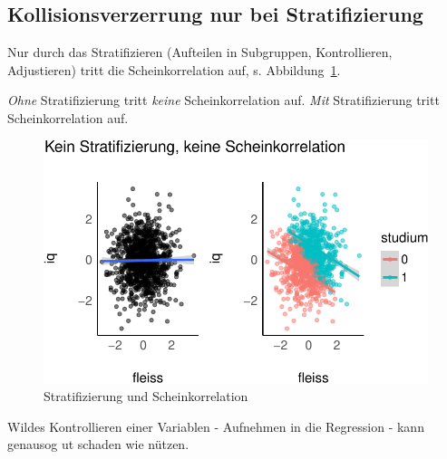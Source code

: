 \documentclass[
  a4paper,
  DIV=11]{scrreprt}
\theoremstyle{definition}
\theoremstyle{remark}
\begin{document}
\hypertarget{kollisionsverzerrung-nur-bei-stratifizierung}{%
\subsection{Kollisionsverzerrung nur bei
Stratifizierung}\label{kollisionsverzerrung-nur-bei-stratifizierung}}

Nur durch das Stratifizieren (Aufteilen in Subgruppen, Kontrollieren,
Adjustieren) tritt die Scheinkorrelation auf, s.
Abbildung~\ref{fig-eignung-strat}.

\begin{tcolorbox}[enhanced jigsaw, leftrule=.75mm, toptitle=1mm, bottomtitle=1mm, titlerule=0mm, breakable, colframe=quarto-callout-note-color-frame, title=\textcolor{quarto-callout-note-color}{\faInfo}\hspace{0.5em}{Hinweis}, rightrule=.15mm, colback=white, arc=.35mm, left=2mm, bottomrule=.15mm, coltitle=black, opacitybacktitle=0.6, toprule=.15mm, colbacktitle=quarto-callout-note-color!10!white, opacityback=0]
\emph{Ohne} Stratifizierung tritt \emph{keine} Scheinkorrelation auf.
\emph{Mit} Stratifizierung tritt Scheinkorrelation auf.
\end{tcolorbox}

\begin{figure}

{\centering \includegraphics{./kausal_files/figure-pdf/fig-eignung-strat-1.pdf}

}

\caption{\label{fig-eignung-strat}Stratifizierung und Scheinkorrelation}

\end{figure}

Wildes Kontrollieren einer Variablen - Aufnehmen in die Regression -
kann genausog ut schaden wie nützen.
\end{document}
